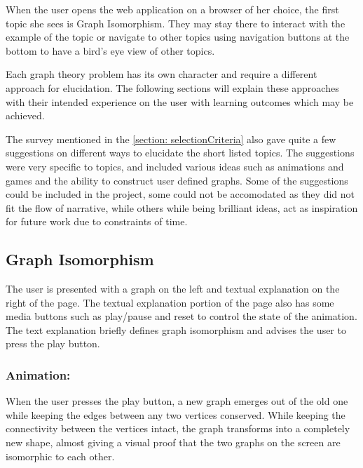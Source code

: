 When the user opens the web application on a browser of her choice, the first
topic she sees is Graph Isomorphism. They may stay there to interact
with the example of the topic or navigate to other topics using navigation
buttons at the bottom to have a bird's eye view of other topics.

Each graph theory problem has its own character and require a different
approach for elucidation. The following sections will explain these approaches
with their intended experience on the user with learning outcomes which may be
achieved.

The survey mentioned in the \autoref{section: selectionCriteria} also gave
quite a few suggestions on different ways to elucidate the short listed topics.
The suggestions were very specific to topics, and included various ideas such as
animations and games and the ability to construct user defined graphs. Some
of the suggestions could be included in the project, some could not be
accomodated as they did not fit the flow of narrative, while others while being
brilliant ideas, act as inspiration for future work due to constraints of time.

\subsection{Graph Isomorphism}
\label{story: isomorphism}
The user is presented with a graph on the left and textual explanation on the
right of the page.  The textual explanation portion of the page also has some
media buttons such as play/pause and reset to control the state of the
animation. The text explanation briefly defines graph isomorphism and advises
the user to press the play button.

\subsubsection{Animation:}
When the user presses the play button, a new graph emerges out of the old one
while keeping the edges between any two vertices conserved. 
While keeping the connectivity between the vertices intact, the graph
transforms into a completely new shape, almost giving a visual proof that the
two graphs on the screen are isomorphic to each other.

